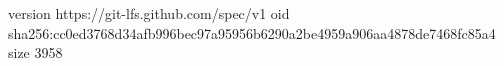 version https://git-lfs.github.com/spec/v1
oid sha256:cc0ed3768d34afb996bec97a95956b6290a2be4959a906aa4878de7468fc85a4
size 3958
